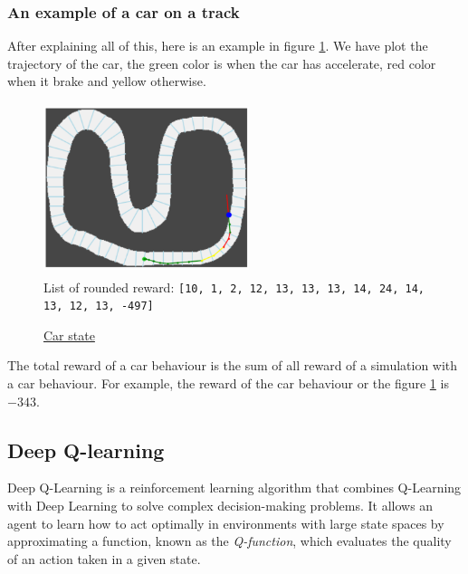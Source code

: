 \documentclass[11pt,a4paper]{article}
\newcounter{fig}
\begin{document}
			\subsubsection*{An example of a car on a track}
After explaining all of this, here is an example in figure \ref{figure:env example}. We have plot the trajectory of the car, the green color is when the car has accelerate, red color when it brake and yellow otherwise.
\begin{center}
	\begin{figure}[ht]
		\centering
		\includegraphics[width=6cm, height=5cm]{env_example.png}\\
		List of rounded reward: \texttt{[10, 1, 2, 12, 13, 13, 13, 14, 24, 14, 13, 12, 13, -497]}
		\caption{\underline{Car state}}
		\label{figure:env example}
	\end{figure}
\end{center}
The total reward of a car behaviour is the sum of all reward of a simulation with a car behaviour. For example, the reward of the car behaviour or the figure \ref{figure:env example} is $-343$.


		\subsection*{Deep Q-learning}
Deep Q-Learning is a reinforcement learning algorithm that combines Q-Learning with Deep Learning to solve complex decision-making problems. It allows an agent to learn how to act optimally in environments with large state spaces by approximating a function, known as the \textit{Q-function}, which evaluates the quality of an action taken in a given state.
    
\end{document}
